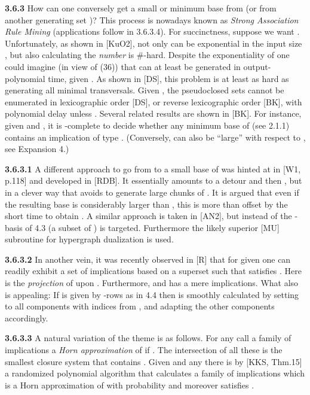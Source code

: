 \documentclass[11pt]{article}
\begin{document}
{\bf 3.6.3} How can one conversely get a small or minimum base  from  (or from another generating set )?
 This process is nowadays known as {\it Strong Association Rule Mining} (applications follow in 3.6.3.4). For succinctness, suppose we want . Unfortunately, as shown in [KuO2], not only can  be exponential in the input size , but also calculating the {\it number}  is \#-hard.  Despite the exponentiality of  one could imagine (in view of (36)) that  can at least be generated in output-polynomial time, given . As shown in [DS], this problem is at least as hard as generating all minimal transversals. Given , the pseudoclosed sets cannot be enumerated in lexicographic order [DS], or reverse lexicographic order [BK], with polynomial delay unless . Several related results are shown in [BK]. For instance, given  and , it is -complete to decide whether any minimum base  of  (see 2.1.1) contains an implication of type . (Conversely,  can also be ``large'' with respect to , see Expansion 4.)
 
{\bf 3.6.3.1}  A different approach to go from  to a small base  of   was hinted at in [W1, p.118] and developed in [RDB]. It essentially amounts to a detour  and then , but in a clever way that avoids to generate large chunks of . It is argued that even if the resulting base  is considerably larger than , this is more than offset by the short time to obtain . A similar approach is taken in [AN2], but instead of  the -basis of 4.3 (a subset of ) is targeted. Furthermore the likely superior [MU] subroutine for hypergraph dualization is used.

{\bf 3.6.3.2} In another vein, it was recently observed in [R] that for given  one can readily exhibit a set  of implications based on a superset  such that  satisfies . Here  is the {\it projection} of  upon . Furthermore,  and  has a mere  implications. What also is appealing: If  is given by -rows as in 4.4 then  is smoothly calculated by setting to  all components with indices from , and adapting the other components accordingly.

  
{\bf 3.6.3.3} A natural variation of the  theme is as follows. For any  call a family  of implications a {\it Horn approximation} of  if . The intersection of all these  is the smallest closure system  that contains .  Given  and any  there is by [KKS, Thm.15] a randomized polynomial algorithm that calculates a family  of implications which is a Horn approximation of  with probability  and moreover satisfies .
 
\end{document}
